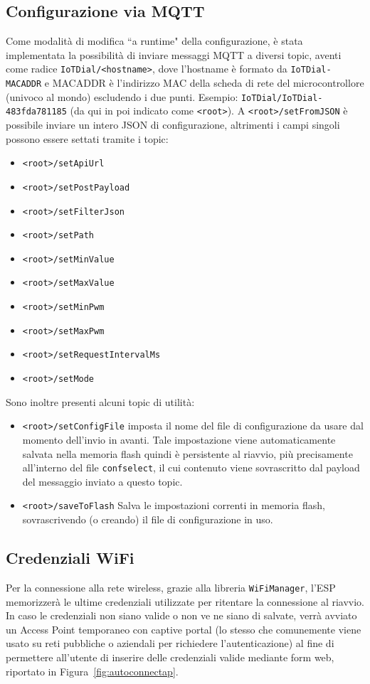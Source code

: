 \documentclass[12pt,a4paper]{report}
\begin{document}
\subsection{Configurazione via MQTT}
Come modalità di modifica ``a runtime" della configurazione, è stata implementata la possibilità di inviare messaggi MQTT a diversi
topic, aventi come radice \texttt{IoTDial/<hostname>}, dove l'hostname è formato da \texttt{IoTDial-MACADDR} e MACADDR è
l'indirizzo MAC della scheda di rete del microcontrollore (univoco al mondo) escludendo i due punti. Esempio: 
\texttt{IoTDial/IoTDial-483fda781185} (da qui in poi indicato come \texttt{<root>}).
A \texttt{<root>/setFromJSON} è possibile inviare un intero JSON di configurazione, altrimenti i campi singoli possono essere
settati tramite i topic:
\begin{itemize}
  \item \texttt{<root>/setApiUrl}
  \item \texttt{<root>/setPostPayload}
  \item \texttt{<root>/setFilterJson}
  \item \texttt{<root>/setPath}
  \item \texttt{<root>/setMinValue}
  \item \texttt{<root>/setMaxValue}
  \item \texttt{<root>/setMinPwm}
  \item \texttt{<root>/setMaxPwm}
  \item \texttt{<root>/setRequestIntervalMs}
  \item \texttt{<root>/setMode}
\end{itemize}
\noindent Sono inoltre presenti alcuni topic di utilità:
\begin{itemize}
  \item \texttt{<root>/setConfigFile} imposta il nome del file di configurazione da usare dal momento dell'invio in avanti. Tale
		impostazione viene automaticamente salvata nella memoria flash quindi è persistente al riavvio, più precisamente
		all'interno del file \texttt{confselect}, il cui contenuto viene sovrascritto dal payload del messaggio inviato a questo topic.
  \item \texttt{<root>/saveToFlash} Salva le impostazioni correnti in memoria flash, sovrascrivendo (o creando) il file di configurazione
		in uso.
\end{itemize}

\subsection{Credenziali WiFi}
Per la connessione alla rete wireless, grazie alla libreria \texttt{WiFiManager}, l'ESP memorizzerà le ultime credenziali utilizzate
per ritentare la connessione al riavvio. In caso le credenziali non siano valide o non ve ne siano di salvate, verrà avviato un
Access Point temporaneo con captive portal (lo stesso che comunemente viene usato su reti pubbliche o aziendali per richiedere
l'autenticazione) al fine di permettere all'utente di inserire delle credenziali valide mediante form web, riportato in
Figura~\ref{fig:autoconnectap}.
\end{document}

